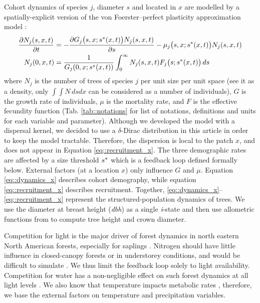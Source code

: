 Cohort dynamics of species $ j $, diameter $ s $ and located in $ x $ are modelled by a spatially-explicit version of the von Foerster--perfect plasticity approximation model \citep[hereafter, von Foerster--PPA]{Strigul2008}:
\begin{align}
	\frac{\partial N_j(s, x, t)}{\partial t} &= - \frac{\partial G_j \big(s, x; {s}^{*}(x, t) \big) N_j(s, x, t)}{\partial s} - \mu_j\big(s, x; {s}^{*}(x, t) \big) N_j(s, x, t) \label{eq::dynamics_x} \\
	N_j(0, x, t) &= \frac{1}{G_j(0, x; {s}^{*}(x, t))} \int_0^{\infty} N_j(s, x, t) F_j\big(s; {s}^{*}(x, t) \big) \, ds \label{eq::recruitment_x}
\end{align}
where $ N_j $ is the number of trees of species $ j $ per unit size per unit space (see it as a density, only $ \int \int N \, ds dx $ can be considered as a number of individuals), $ G $ is the growth rate of individuals, $ \mu $ is the mortality rate, and $ F $ is the effective fecundity function (\cf Tab. \ref{tab::notations} for list of notations, definitions and units for each variable and parameter). Although we developed the model with a dispersal kernel, we decided to use a $ \delta $-Dirac distribution in this article in order to keep the model tractable. Therefore, the dispersion is local to the patch $ x $, and does not appear in Equation \eqref{eq::recruitment_x}. The three demographic rates are affected by a size threshold $ {s}^{*} $ which is a feedback loop defined formally below. External factors (at a location $ x $) only influence $ G $ and $ \mu $. Equation \eqref{eq::dynamics_x} describes cohort demography, while equation \eqref{eq::recruitment_x} describes recruitment. Together, \eqref{eq::dynamics_x}--\eqref{eq::recruitment_x} represent the structured-population dynamics of trees. We use the diameter at breast height (\textit{dbh}) as a single \textit{i}-state and then use allometric functions from \citet{Purves2007} to compute tree height and crown diameter.

Competition for light is the major driver of forest dynamics in north eastern North American forests, especially for saplings \citep{Pacala1996, Purves2007}. Nitrogen should have little influence in closed-canopy forests or in understorey conditions, and would be difficult to simulate \citep{Kobe2006}. We thus limit the feedback loop solely to light availability. Competition for water has a non-negligible effect on such forest dynamics at all light levels \citep{Kobe2006}. We also know that temperature impacts metabolic rates \citep{Brown2004}, therefore, we base the external factors on temperature and precipitation variables.

